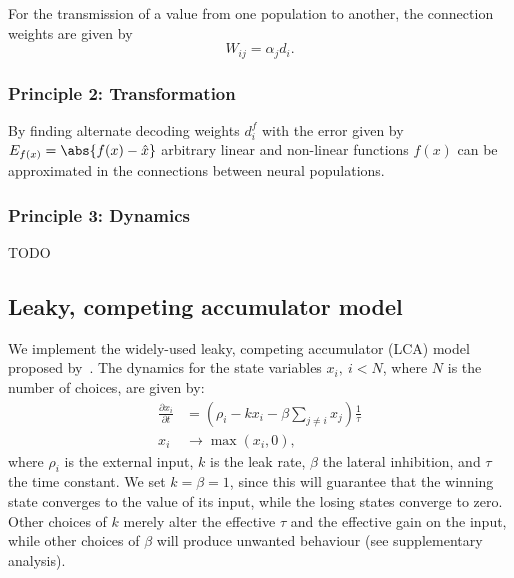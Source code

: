 \documentclass[10pt,letterpaper]{article}
\begin{document}
For the transmission of a value from one population to another, the connection 
weights are given by
\begin{equation}
    W_{ij} = \alpha_j d_i \text{.}
\end{equation}

\subsubsection{Principle 2: Transformation}
By finding alternate decoding weights $d^f_i$ with the error given by $E_{f(x)} 
= \abs{f(x) - \hat x}$ arbitrary linear and non-linear functions $f(x)$ can be 
approximated in the connections between neural populations.

\subsubsection{Principle 3: Dynamics}
TODO

\subsection{Leaky, competing accumulator model}
We implement the widely-used leaky, competing accumulator (LCA) model proposed 
by~.  The dynamics for the state variables $x_i,\ i < N$, where 
$N$ is the number of choices, are given by:
\begin{equation} \label{eqn:usher-mcclelland}
    \begin{split}
        \frac{{\partial x}_i}{\partial t} &= \left(\rho_i - kx_i - \beta \sum_{j \neq i} x_j\right) \frac{1}{\tau} \\
        x_i &\rightarrow \max(x_i, 0) ,
    \end{split}
\end{equation}
where $\rho_i$ is the external input, $k$ is the leak rate, $\beta$ the lateral 
inhibition, and $\tau$ the time constant.
We set $k = \beta = 1$, since this will guarantee that the winning state converges to the value of its input, while the losing states converge to zero.
Other choices of $k$ merely alter the effective $\tau$ and the effective gain on the input, while other choices of $\beta$ will produce unwanted behaviour (see supplementary analysis).
\end{document}
